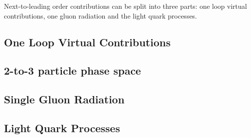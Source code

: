 Next-to-leading order contributions can be split into three parts: one loop virtual contributions, one gluon radiation and the light quark processes.

\subsection{One Loop Virtual Contributions}


\subsection{2-to-3 particle phase space}


\subsection{Single Gluon Radiation}


\subsection{Light Quark Processes}


